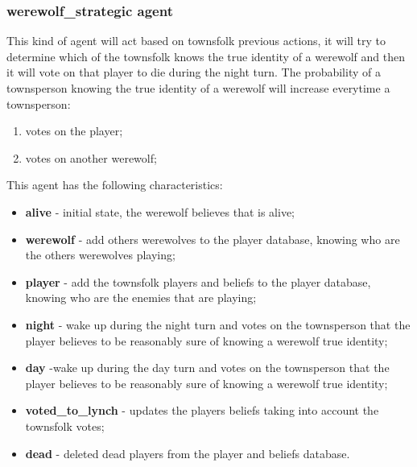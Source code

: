\documentclass{article}
\begin{document}
\subsubsection{werewolf\_strategic agent}
This kind of agent will act based on townsfolk previous actions, it will try to determine which of the townsfolk knows the true identity of a werewolf and then it will vote on that player to die during the night turn.
The probability of a townsperson knowing the true identity of a werewolf will increase everytime a townsperson:
\begin{enumerate}
	\item votes on the player;
	\item votes on another werewolf;
\end{enumerate}
This agent has the following characteristics:
\begin{itemize}
	\item \textbf{alive} - initial state, the werewolf believes that is alive;
	\item \textbf{werewolf} - add others werewolves to the player database, knowing who are the others werewolves playing;
	\item \textbf{player} - add the townsfolk players and beliefs to the player database, knowing who are the enemies that are playing;
	\item \textbf{night} - wake up during the night turn and votes on the townsperson that the player believes to be reasonably sure of knowing a werewolf true identity;
	\item \textbf{day} -wake up during the day turn and votes on the townsperson that the player believes to be reasonably sure of knowing a werewolf true identity;
	\item \textbf{voted\_to\_lynch} - updates the players beliefs taking into account the townsfolk votes;
	\item \textbf{dead} - deleted dead players from the player and beliefs database.
\end{itemize}
\end{document}
